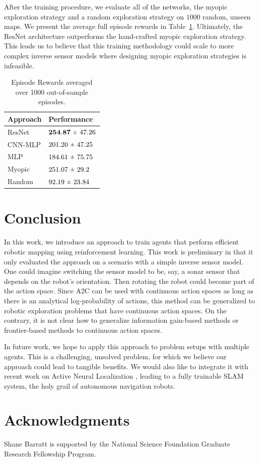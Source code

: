 \documentclass{article}
\newcommand{\rpm}{\raisebox{.2ex}{$\scriptstyle\pm$}}
\begin{document}
After the training procedure, we evaluate all of the networks, the myopic exploration strategy and a random exploration strategy on $1000$ random, unseen maps. We present the average full episode rewards in Table~\ref{tab:results}. Ultimately, the ResNet architecture outperforms the hand-crafted myopic exploration strategy. This leads us to believe that this training methodology could scale to more complex inverse sensor models where designing myopic exploration strategies is infeasible.

\begin{table}[H]
  \caption{Episode Rewards averaged over 1000 out-of-sample episodes.}
  \label{tab:results}
  \centering
  \begin{tabular}{ll}
    \toprule
    Approach & Performance \\
    \midrule
    ResNet   & $\mathbf{254.87} \ \rpm \ 47.26$  \\
    CNN-MLP  & $201.20 \ \rpm \ 47.25$ \\
    MLP      & $184.61 \ \rpm \ 75.75$ \\
    Myopic   & $251.07 \ \rpm \ 29.2$ \\
    Random   & $92.19 \ \rpm \ 23.84$ \\
    \bottomrule
  \end{tabular}
\end{table}

\section{Conclusion}

In this work, we introduce an approach to train agents that perform efficient robotic mapping using reinforcement learning. This work is preliminary in that it only evaluated the approach on a scenario with a simple inverse sensor model. One could imagine switching the sensor model to be, say, a sonar sensor that depends on the robot's orientation. Then rotating the robot could become part of the action space. Since A2C can be used with continuous action spaces as long as there is an analytical log-probability of actions, this method can be generalized to robotic exploration problems that have continuous action spaces. On the contrary, it is not clear how to generalize information gain-based methods or frontier-based methods to continuous action spaces.

In future work, we hope to apply this approach to problem setups with multiple agents. This is a challenging, unsolved problem, for which we believe our approach could lead to tangible benefits. We would also like to integrate it with recent work on Active Neural Localization \cite{nal}, leading to a fully trainable SLAM system, the holy grail of autonomous navigation robots.

\section*{Acknowledgments}

Shane Barratt is supported by the National Science Foundation Graduate Research Fellowship Program.

{}


\appendix
\end{document}
